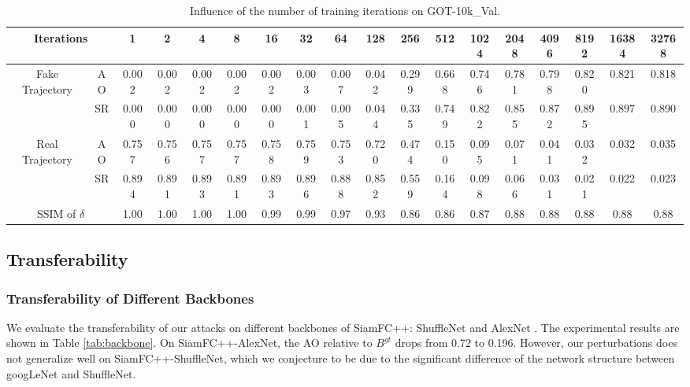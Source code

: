 \documentclass{article}
\begin{document}
\begin{table}
\centering
\scriptsize
\tabcolsep=4.0pt
\label{tab:iter}
\begin{tabular}{cc|cccccccccccccccc} 
\toprule
\multicolumn{2}{c|}{Iterations}     & 1     & 2     & 4     & 8     & 16    & 32    & 64    & 128   & 256   & 512   & 1024  & 2048  & 4096  & 8192  & 16384 & 32768  \\ 
\midrule
\multirow{2}{*}{Fake Trajectory} & AO    & 0.002 & 0.002 & 0.002 & 0.002 & 0.002 & 0.003 & 0.007 & 0.042 & 0.299 & 0.668 & 0.746 & 0.781 & 0.798 & 0.820 & 0.821 & 0.818  \\
                                 & SR    & 0.000 & 0.000 & 0.000 & 0.000 & 0.000 & 0.001 & 0.005 & 0.044 & 0.335 & 0.749 & 0.822 & 0.855 & 0.872 & 0.895 & 0.897 & 0.890  \\ 
\midrule
\multirow{2}{*}{Real Trajectory} & AO    & 0.757 & 0.756 & 0.757 & 0.757 & 0.758 & 0.759 & 0.753 & 0.720 & 0.474 & 0.150 & 0.095 & 0.071 & 0.041 & 0.032 & 0.032 & 0.035  \\
                                 & SR    & 0.894 & 0.891 & 0.893 & 0.891 & 0.893 & 0.896 & 0.888 & 0.852 & 0.559 & 0.164 & 0.098 & 0.066 & 0.031 & 0.021 & 0.022 & 0.023  \\ 
\midrule
\multicolumn{2}{c|}{SSIM of $\delta$}                        & 1.00  & 1.00  & 1.00  & 1.00  & 0.99  & 0.99  & 0.97  & 0.93  & 0.86  & 0.86  & 0.87  & 0.88  & 0.88  & 0.88  & 0.88  & 0.88   \\
\bottomrule
\end{tabular}
\caption{Influence of the number of training iterations on GOT-10k\_Val.}
\label{tab:iter}
\end{table}

\subsection{Transferability}

\subsubsection{Transferability of Different Backbones}

We evaluate the transferability of our attacks on different backbones of SiamFC++: ShuffleNet \cite{ShuffleNet} and AlexNet \cite{AlexNet}.
The experimental results are shown in Table \ref{tab:backbone}. On SiamFC++-AlexNet, the AO relative to $B^{gt}$ drops from 0.72 to 0.196. However, our perturbations does not generalize well on SiamFC++-ShuffleNet, which we conjecture to be due to the significant difference of the network structure between googLeNet and ShuffleNet.
\end{document}
